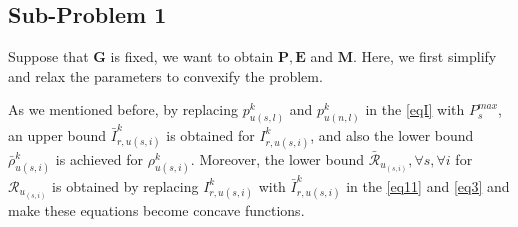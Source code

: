 \documentclass[conference]{IEEEtran}
\begin{document}
\subsection{Sub-Problem 1}\label{sub1}
Suppose that $\boldsymbol{G}$ is fixed, we want to obtain $\boldsymbol{P}, \boldsymbol{E}$ and $\boldsymbol{M}$.
Here, we first simplify and relax the parameters to convexify the problem.

As we mentioned before, by replacing $p_{u(s,l)}^{k}$ and $p_{u(n,l)}^{k}$ in the \eqref{eqI} with $P^{max}_s$, an upper bound $\bar{I}_{r,u(s,i)}^{k}$ is obtained for $I_{r,u(s,i)}^{k}$, and also the lower bound $\bar{\rho}_{u(s,i)}^{k}$ is achieved
for $\rho_{u(s,i)}^{k}$. 
Moreover, the lower bound $\bar{\mathcal{R}}_{u_{(s,i)}}, \forall s , \forall i$ for  ${\mathcal{R}}_{u_{(s,i)}}$ is obtained by replacing $I_{r,u(s,i)}^{k}$ with $\bar{I}_{r,u(s,i)}^{k}$ in the \eqref{eq11} and \eqref{eq3} and make these equations become concave functions.
\end{document}
